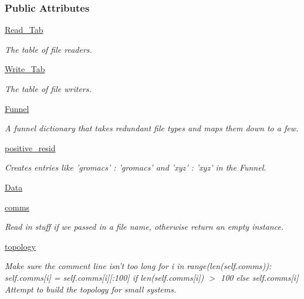 \subsubsection*{Public Attributes}
\begin{DoxyCompactItemize}
\item 
\hyperlink{classforcebalance_1_1molecule_1_1Molecule_a35600d98f150597c9d9ac5129e01bd8d}{Read\-\_\-\-Tab}
\begin{DoxyCompactList}\small\item\em The table of file readers. \end{DoxyCompactList}\item 
\hyperlink{classforcebalance_1_1molecule_1_1Molecule_a85310a28c678cb386f9d2b584b24320d}{Write\-\_\-\-Tab}
\begin{DoxyCompactList}\small\item\em The table of file writers. \end{DoxyCompactList}\item 
\hyperlink{classforcebalance_1_1molecule_1_1Molecule_a491b10f21e93f841a770088402a13924}{Funnel}
\begin{DoxyCompactList}\small\item\em A funnel dictionary that takes redundant file types and maps them down to a few. \end{DoxyCompactList}\item 
\hyperlink{classforcebalance_1_1molecule_1_1Molecule_af9d8dc89fee54b2b89558633f2c9b70a}{positive\-\_\-resid}
\begin{DoxyCompactList}\small\item\em Creates entries like 'gromacs' \-: 'gromacs' and 'xyz' \-: 'xyz' in the Funnel. \end{DoxyCompactList}\item 
\hyperlink{classforcebalance_1_1molecule_1_1Molecule_a69c18c3fad45cd38102d9582445f5c6d}{Data}
\item 
\hyperlink{classforcebalance_1_1molecule_1_1Molecule_adf9f25ebcf955be562ef186b822e237a}{comms}
\begin{DoxyCompactList}\small\item\em Read in stuff if we passed in a file name, otherwise return an empty instance. \end{DoxyCompactList}\item 
\hyperlink{classforcebalance_1_1molecule_1_1Molecule_a57facdb1b7e71fabfad0df72a7ff94f5}{topology}
\begin{DoxyCompactList}\small\item\em Make sure the comment line isn't too long for i in range(len(self.\-comms))\-: self.\-comms\mbox{[}i\mbox{]} = self.\-comms\mbox{[}i\mbox{]}\mbox{[}\-:100\mbox{]} if len(self.\-comms\mbox{[}i\mbox{]}) $>$ 100 else self.\-comms\mbox{[}i\mbox{]} Attempt to build the topology for small systems. \end{DoxyCompactList}\item 

\end{DoxyCompactItemize}
